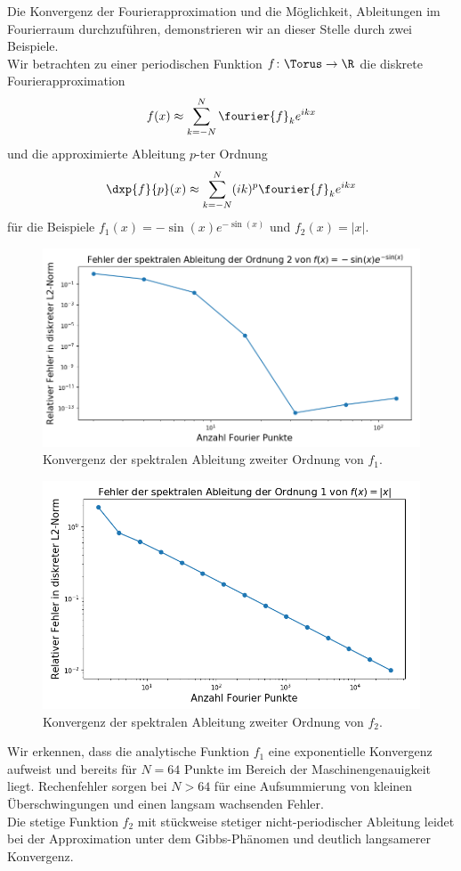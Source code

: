 \begin{mathbsp}
Die Konvergenz der Fourierapproximation und die Möglichkeit, Ableitungen im Fourierraum durchzuführen, demonstrieren wir an dieser Stelle durch zwei Beispiele.\\
Wir betrachten zu einer periodischen Funktion $f\colon\Torus\to\R$ die diskrete Fourierapproximation
\[f(x)\approx \sum_{k=-N}^N\fourier{f}_ke^{ikx}\]
und die approximierte Ableitung $p$-ter Ordnung
\[\dxp{f}{p}(x)\approx \sum_{k=-N}^N(ik)^p\fourier{f}_ke^{ikx}\]
für die Beispiele $f_1(x)=-\sin(x)e^{-\sin(x)}$ und $f_2(x)=|x|$.
\begin{figure}[!htb]
  \includegraphics[width=0.9\linewidth]{Figures/spectral_derivative_error_cont.png}
  \caption{Konvergenz der spektralen Ableitung zweiter Ordnung von $f_1$.}
\end{figure}
\begin{figure}[!htb]
  \includegraphics[width=0.9\linewidth]{Figures/spectral_derivative_error_discont.png}
  \caption{Konvergenz der spektralen Ableitung zweiter Ordnung von $f_2$.}
\end{figure}
Wir erkennen, dass die analytische Funktion $f_1$ eine exponentielle Konvergenz aufweist und bereits für $N=64$ Punkte im Bereich der Maschinengenauigkeit liegt. Rechenfehler sorgen bei $N>64$ für eine Aufsummierung von kleinen Überschwingungen und einen langsam wachsenden Fehler.\\
Die stetige Funktion $f_2$ mit stückweise stetiger nicht-periodischer Ableitung leidet bei der Approximation unter dem Gibbs-Phänomen und deutlich langsamerer Konvergenz.
\end{mathbsp}

